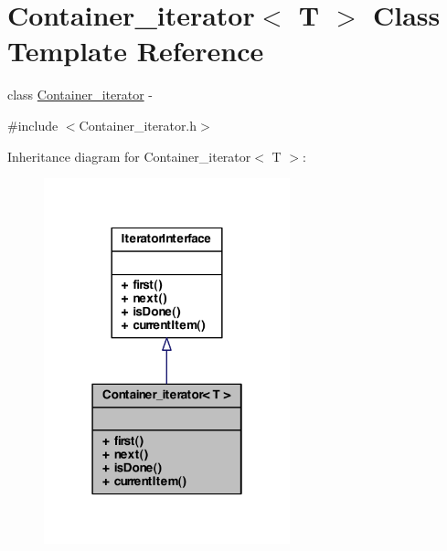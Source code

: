 \hypertarget{class_container__iterator}{
\section{Container\_\-iterator$<$ T $>$ Class Template Reference}
\label{class_container__iterator}
}


class \hyperlink{class_container__iterator}{Container\_\-iterator} -\/  




{\ttfamily \#include $<$Container\_\-iterator.h$>$}



Inheritance diagram for Container\_\-iterator$<$ T $>$:\nopagebreak
\begin{figure}[H]
\begin{center}
\leavevmode
\includegraphics[width=202pt]{class_container__iterator__inherit__graph}
\end{center}
\end{figure}


